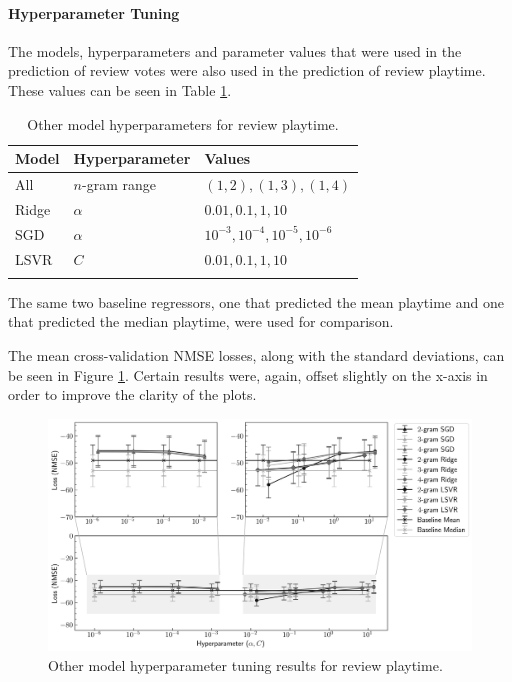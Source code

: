 \paragraph{Hyperparameter Tuning}

The models, hyperparameters and parameter values that were used in the prediction of review votes were also used in the prediction of review playtime. These values can be seen in Table \ref{tab:DI_RF_PT_BaseHP}.

\begin{table}[ht]
    \centering
    \begin{tabular}{l l l}
        \toprule
        \textbf{Model} & \textbf{Hyperparameter} & \textbf{Values}\\\midrule
        All & $n$-gram range & $(1, 2), (1, 3), (1, 4)$\\
        Ridge & $\alpha$ & $0.01, 0.1, 1, 10$\\
        SGD & $\alpha$ & $10^{-3}, 10^{-4}, 10^{-5}, 10^{-6}$\\
        LSVR & $C$ & $0.01, 0.1, 1, 10$\\
        \bottomrule\\
    \end{tabular}
    \caption{Other model hyperparameters for review playtime.}
    \label{tab:DI_RF_PT_BaseHP}
\end{table}

The same two baseline regressors, one that predicted the mean playtime and one that predicted the median playtime, were used for comparison.

The mean cross-validation NMSE losses, along with the standard deviations, can be seen in Figure \ref{fig:DI_RF_PT_BaseHP}. Certain results were, again, offset slightly on the x-axis in order to improve the clarity of the plots.

\begin{figure}[ht]
    \hspace*{-0.3in}
    \includegraphics[scale=0.55]{figures/05_impl/01_rfp/03_pt/plot_hyperparams_base.png}
    \caption{Other model hyperparameter tuning results for review playtime.}
    \label{fig:DI_RF_PT_BaseHP}
\end{figure}

